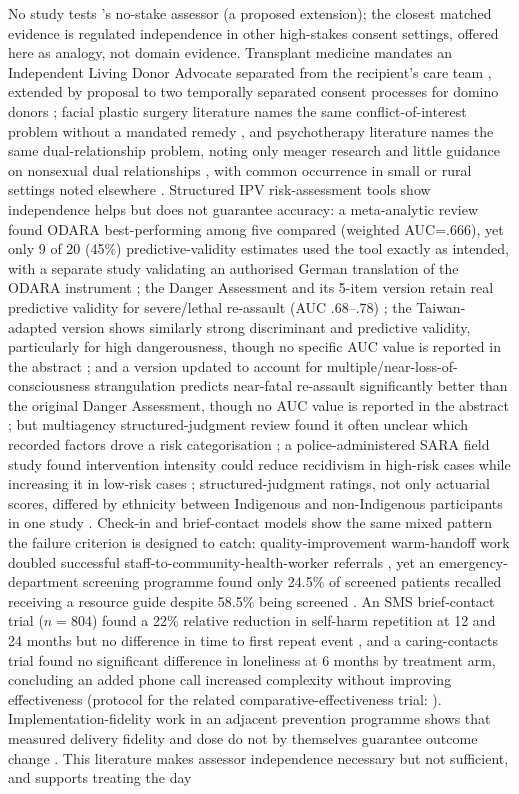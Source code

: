 No study tests \tphe{}'s no-stake assessor (a proposed extension); the closest matched evidence is regulated independence in other high-stakes consent settings, offered here as analogy, not domain evidence. Transplant medicine mandates an Independent Living Donor Advocate separated from the recipient's care team \cite{ref158,ref159}, extended by proposal to two temporally separated consent processes for domino donors \cite{ref160}; facial plastic surgery literature names the same conflict-of-interest problem without a mandated remedy \cite{ref161}, and psychotherapy literature names the same dual-relationship problem, noting only meager research and little guidance on nonsexual dual relationships \cite{ref162}, with common occurrence in small or rural settings noted elsewhere \cite{ref163}. Structured IPV risk-assessment tools show independence helps but does not guarantee accuracy: a meta-analytic review found ODARA best-performing among five compared (weighted AUC=.666), yet only 9 of 20 (45\%) predictive-validity estimates used the tool exactly as intended, with a separate study validating an authorised German translation of the ODARA instrument \cite{ref164,ref168}; the Danger Assessment and its 5-item version retain real predictive validity for severe/lethal re-assault (AUC .68--.78) \cite{ref166}; the Taiwan-adapted version shows similarly strong discriminant and predictive validity, particularly for high dangerousness, though no specific AUC value is reported in the abstract \cite{ref165}; and a version updated to account for multiple/near-loss-of-consciousness strangulation predicts near-fatal re-assault significantly better than the original Danger Assessment, though no AUC value is reported in the abstract \cite{ref167}; but multiagency structured-judgment review found it often unclear which recorded factors drove a risk categorisation \cite{ref169}; a police-administered SARA field study found intervention intensity could reduce recidivism in high-risk cases while increasing it in low-risk cases \cite{ref170}; structured-judgment ratings, not only actuarial scores, differed by ethnicity between Indigenous and non-Indigenous participants in one study \cite{ref171}. Check-in and brief-contact models show the same mixed pattern the failure criterion is designed to catch: quality-improvement warm-handoff work doubled successful staff-to-community-health-worker referrals \cite{ref172}, yet an emergency-department screening programme found only 24.5\% of screened patients recalled receiving a resource guide despite 58.5\% being screened \cite{ref173}. An SMS brief-contact trial ($n=804$) found a 22\% relative reduction in self-harm repetition at 12 and 24 months but no difference in time to first repeat event \cite{ref174}, and a caring-contacts trial found no significant difference in loneliness at 6 months by treatment arm, concluding an added phone call increased complexity without improving effectiveness \cite{ref176} (protocol for the related comparative-effectiveness trial: \cite{ref175}). Implementation-fidelity work in an adjacent prevention programme shows that measured delivery fidelity and dose do not by themselves guarantee outcome change \cite{ref179}. This literature makes assessor independence necessary but not sufficient, and supports treating the day 